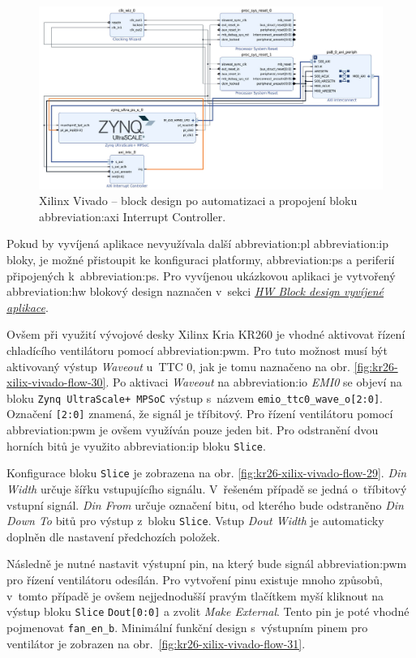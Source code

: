 \documentclass[a4paper, twoside, 11pt]{article}
\newcommand{\fbar}{\FloatBarrier}
\begin{document}
				\begin{figure}[htbp!]
					\centering
					\includegraphics[width=1\textwidth]{src/png/kr26-xilinx-vivado-flow/kr26-xilix-vivado-flow-12.jpg}
					\caption{Xilinx Vivado – block design po automatizaci a propojení bloku \gls{abbreviation:axi} Interrupt Controller.}
					\label{fig:kr26-xilix-vivado-flow-12}
				\end{figure}
				\fbar
				Pokud by vyvíjená aplikace nevyužívala další \gls{abbreviation:pl} \gls{abbreviation:ip} bloky, je možné přistoupit ke konfiguraci platformy, \gls{abbreviation:ps} a periferií připojených k~\gls{abbreviation:ps}. Pro vyvíjenou ukázkovou aplikaci je vytvořený \gls{abbreviation:hw} blokový design naznačen v~sekci \hyperref[subsubsec:hw-block-design-vyvijene-aplikace]{\textit{HW Block design vyvíjené aplikace}}.\par
				Ovšem při využití vývojové desky Xilinx Kria KR260 je vhodné aktivovat řízení chladícího ventilátoru pomocí \gls{abbreviation:pwm}. Pro tuto možnost musí být aktivovaný výstup \textit{Waveout} u~TTC 0, jak je tomu naznačeno na obr. \ref{fig:kr26-xilix-vivado-flow-30}. Po aktivaci \textit{Waveout} na \gls{abbreviation:io} \textit{EMI0} se objeví na bloku \texttt{Zynq UltraScale+ MPSoC} výstup s~názvem \texttt{emio\_ttc0\_wave\_o[2:0]}. Označení \texttt{[2:0]} znamená, že signál je tříbitový. Pro řízení ventilátoru pomocí \gls{abbreviation:pwm} je ovšem využíván pouze jeden bit. Pro odstranění dvou horních bitů je využito \gls{abbreviation:ip} bloku \texttt{Slice}.\par
				Konfigurace bloku \texttt{Slice} je zobrazena na obr. \ref{fig:kr26-xilix-vivado-flow-29}. \textit{Din Width} určuje šířku vstupujícího signálu. V~řešeném případě se jedná o~tříbitový vstupní signál. \textit{Din From} určuje označení bitu, od kterého bude odstraněno \textit{Din Down To} bitů pro výstup z~bloku \texttt{Slice}. Vstup \textit{Dout Width} je automaticky doplněn dle nastavení předchozích položek.\par
				Následně je nutné nastavit výstupní pin, na který bude signál \gls{abbreviation:pwm} pro řízení ventilátoru odesílán. Pro vytvoření pinu existuje mnoho způsobů, v~tomto případě je ovšem nejjednodušší pravým tlačítkem myší kliknout na výstup bloku \texttt{Slice} \texttt{Dout[0:0]} a zvolit \textit{Make External}. Tento pin je poté vhodné pojmenovat \texttt{fan\_en\_b}. Minimální funkční design s~výstupním pinem pro ventilátor je zobrazen na obr.~\ref{fig:kr26-xilix-vivado-flow-31}.
\end{document}
